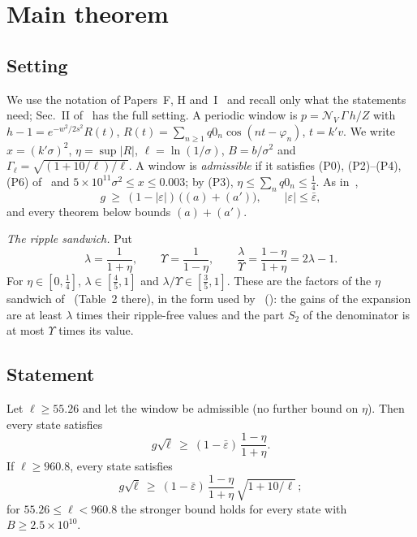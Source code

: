 \section{Main theorem}
\label{sec:main}

\subsection{Setting}
We use the notation of Papers~F, H and~I~\cite{F,H,I} and recall only what the statements need; Sec.~II of~\cite{I} has the full setting.
A periodic window is $p=\mathcal N_V\,\Gamma\,h/Z$ with $h-1=e^{-w^2/2s^2}R(t)$, $R(t)=\sum_{n\ge1}q0_n\cos(nt-\varphi_n)$, $t=k'v$.
We write $x=(k'\sigma)^2$, $\eta=\sup|R|$, $\ell=\ln(1/\sigma)$, $B=b/\sigma^2$ and $\Gamma_\ell=\sqrt{(1+10/\ell)/\ell}$.
A window is \emph{admissible} if it satisfies (P0), (P2)--(P4), (P6) of~\cite{F} and $5\times10^{11}\sigma^2\le x\le0.003$; by (P3), $\eta\le\sum_nq0_n\le\tfrac14$.
As in~\cite{F,I},
\begin{equation}
g\ \ge\ (1-|\varepsilon|)\,\bigl((a)+(a')\bigr),\qquad |\varepsilon|\le\bar\varepsilon,
\label{eq:ga}
\end{equation}
and every theorem below bounds $(a)+(a')$.

\emph{The ripple sandwich.}
Put
\begin{equation}
\lambda=\frac1{1+\eta},\qquad \Upsilon=\frac1{1-\eta},\qquad \frac\lambda\Upsilon=\frac{1-\eta}{1+\eta}=2\lambda-1 .
\label{eq:sandwich}
\end{equation}
For $\eta\in[0,\tfrac14]$, $\lambda\in[\tfrac45,1]$ and $\lambda/\Upsilon\in[\tfrac35,1]$.
These are the factors of the $\eta$ sandwich of~\cite{F} (Table~2 there), in the form used by~\cite{H} (): the gains of the expansion are at least $\lambda$ times their ripple-free values and the part $S_2$ of the denominator is at most $\Upsilon$ times its value.

\subsection{Statement}

\begin{theorem} 
\label{thm:J}
Let $\ell\ge55.26$ and let the window be admissible (no further bound on $\eta$).
Then every state satisfies
\begin{equation}
g\sqrt\ell\ \ge\ (1-\bar\varepsilon)\,\frac{1-\eta}{1+\eta}.
\end{equation}
If $\ell\ge960.8$, every state satisfies
\begin{equation}
g\sqrt\ell\ \ge\ (1-\bar\varepsilon)\,\frac{1-\eta}{1+\eta}\,\sqrt{1+10/\ell}\,;
\end{equation}
for $55.26\le\ell<960.8$ the stronger bound holds for every state with $B\ge2.5\times10^{10}$.
\end{theorem}

